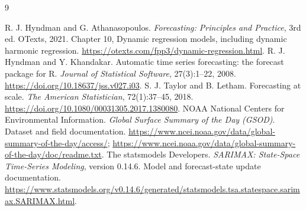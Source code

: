 \documentclass{article}
\begin{document}
\begin{thebibliography}{9}
\raggedright
{} R. J. Hyndman and G. Athanasopoulos. \emph{Forecasting: Principles and
Practice}, 3rd ed. OTexts, 2021. Chapter 10, Dynamic regression models,
including dynamic harmonic regression.
\url{https://otexts.com/fpp3/dynamic-regression.html}.
 R. J. Hyndman and Y. Khandakar. Automatic time series forecasting:
the forecast package for R. \emph{Journal of Statistical Software}, 27(3):1--22,
2008. \url{https://doi.org/10.18637/jss.v027.i03}.
 S. J. Taylor and B. Letham. Forecasting at scale.
\emph{The American Statistician}, 72(1):37--45, 2018.
\url{https://doi.org/10.1080/00031305.2017.1380080}.
 NOAA National Centers for Environmental Information. \emph{Global Surface
Summary of the Day (GSOD)}. Dataset and field documentation.
\url{https://www.ncei.noaa.gov/data/global-summary-of-the-day/access/};
\url{https://www.ncei.noaa.gov/data/global-summary-of-the-day/doc/readme.txt}.
 The statsmodels Developers. \emph{SARIMAX: State-Space Time-Series
Modeling}, version 0.14.6. Model and forecast-state update documentation.
\url{https://www.statsmodels.org/v0.14.6/generated/statsmodels.tsa.statespace.sarimax.SARIMAX.html}.
\end{thebibliography}
\end{document}
